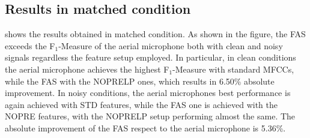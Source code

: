 
\subsection{Results in matched condition}
 shows the results obtained in matched condition. As shown in the figure, the FAS exceeds the F$_1$-Measure of the aerial microphone both with clean and noisy signals regardless the feature setup employed. In particular, in clean conditions the aerial microphone achieves the highest F$_1$-Measure with standard MFCCs, while the FAS with the NOPRELP ones, which results in 6.50\% absolute improvement. In noisy conditions, the aerial microphones best performance is again achieved with STD features, while the FAS one is achieved with the NOPRE features, with the NOPRELP setup performing almost the same. The absolute improvement of the FAS respect to the aerial microphone is 5.36\%.

